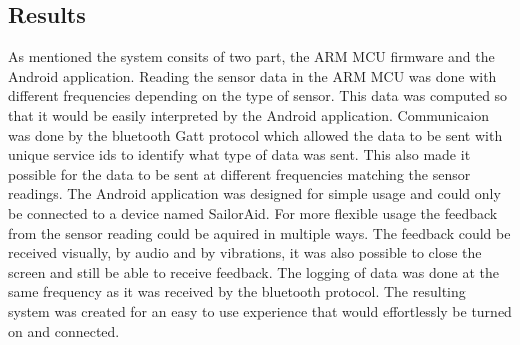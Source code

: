 \subsection{Results}
As mentioned the system consits of two part, the ARM MCU firmware and the Android application. Reading the sensor data in the ARM MCU was done with different frequencies depending on the type of sensor. This data was computed so that it would be easily interpreted by the Android application. Communicaion was done by the bluetooth Gatt protocol which allowed the data to be sent with unique service ids to identify what type of data was sent. This also made it possible for the data to be sent at different frequencies matching the sensor readings. The Android application was designed for simple usage and could only be connected to a device named SailorAid. For more flexible usage the feedback from the sensor reading could be aquired in multiple ways. The feedback could be received visually, by audio and by vibrations, it was also possible to close the screen and still be able to receive feedback. The logging of data was done at the same frequency as it was received by the bluetooth protocol. The resulting system was created for an easy to use experience that would effortlessly be turned on and connected.